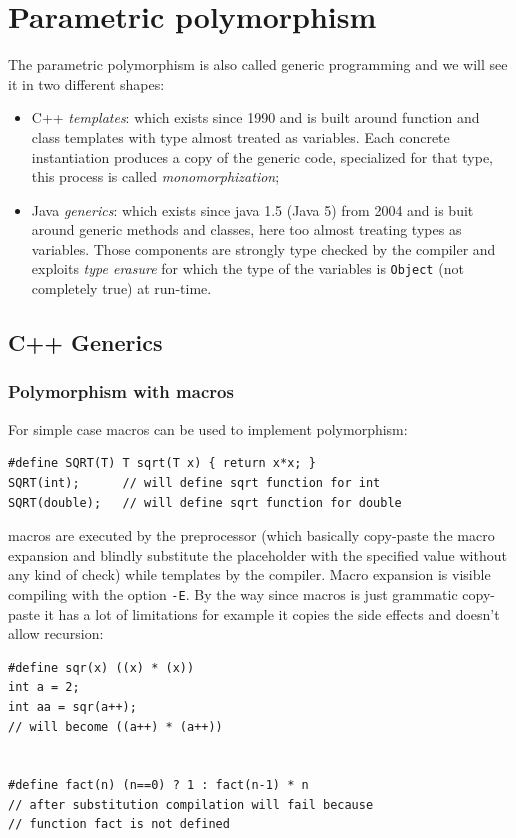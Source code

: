 \section{Parametric polymorphism}
The parametric polymorphism is also called generic programming and we will see it in two different shapes:
\begin{itemize}
    \item C++ \emph{templates}: which exists since 1990 and is built around function and class templates with type almost treated as variables.
    Each concrete instantiation produces a copy of the generic code, specialized for that type, this process is called \emph{monomorphization};
    
    \item Java \emph{generics}: which exists since java 1.5 (Java 5) from 2004 and is buit around generic methods and classes, here too almost treating types as variables.
    Those components are strongly type checked by the compiler and exploits \emph{type erasure} for which the type of the variables is \verb|Object| (not completely true) at run-time.
\end{itemize}

\subsection{C++ Generics}
\subsubsection{Polymorphism with macros}
For simple case macros can be used to implement polymorphism:
\begin{verbatim}
#define SQRT(T) T sqrt(T x) { return x*x; }
SQRT(int);      // will define sqrt function for int
SQRT(double);   // will define sqrt function for double
\end{verbatim}
macros are executed by the preprocessor (which basically copy-paste the macro expansion and blindly substitute the placeholder with the specified value without any kind of check) while templates by the compiler.
Macro expansion is visible compiling with the option \verb|-E|.
By the way since macros is just grammatic copy-paste it has a lot of limitations for example it copies the side effects and doesn't allow recursion:
\begin{verbatim}
#define sqr(x) ((x) * (x))
int a = 2;
int aa = sqr(a++);
// will become ((a++) * (a++))


#define fact(n) (n==0) ? 1 : fact(n-1) * n
// after substitution compilation will fail because
// function fact is not defined
\end{verbatim}

